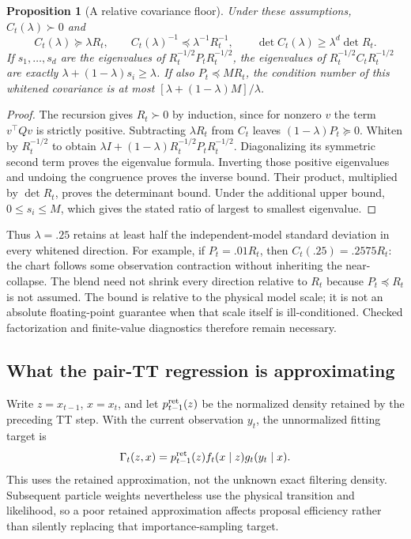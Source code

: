 \documentclass[11pt]{article}
\newtheorem{proposition}{Proposition}
\begin{document}
\begin{proposition}[A relative covariance floor]
\label{prop:a11-floor}
Under these assumptions, $C_t(\lambda)\succ0$ and
\begin{equation}
 C_t(\lambda)\succeq\lambda R_t,\qquad
 C_t(\lambda)^{-1}\preceq\lambda^{-1}R_t^{-1},\qquad
 \det C_t(\lambda)\ge\lambda^d\det R_t.
 \label{eq:a11-floor}
\end{equation}
If $s_1,\ldots,s_d$ are the eigenvalues of
$R_t^{-1/2}P_tR_t^{-1/2}$, the eigenvalues of
$R_t^{-1/2}C_tR_t^{-1/2}$ are exactly
$\lambda+(1-\lambda)s_i\ge\lambda$. If also $P_t\preceq M R_t$,
the condition number of this whitened covariance is at most
$[\lambda+(1-\lambda)M]/\lambda$.
\end{proposition}
\begin{proof}
The recursion gives $R_t\succ0$ by induction, since for nonzero $v$ the
term $v^\top Qv$ is strictly positive. Subtracting $\lambda R_t$ from
$C_t$ leaves $(1-\lambda)P_t\succeq0$. Whiten by $R_t^{-1/2}$ to obtain
$\lambda I+(1-\lambda)R_t^{-1/2}P_tR_t^{-1/2}$. Diagonalizing its
symmetric second term proves the eigenvalue formula. Inverting those
positive eigenvalues and undoing the congruence proves the inverse bound.
Their product, multiplied by $\det R_t$, proves the determinant bound.
Under the additional upper bound, $0\le s_i\le M$, which gives the
stated ratio of largest to smallest eigenvalue.
\end{proof}

Thus $\lambda=.25$ retains at least half the independent-model standard
deviation in every whitened direction. For example, if $P_t=.01R_t$,
then $C_t(.25)=.2575R_t$: the chart follows some observation contraction
without inheriting the near-collapse. The blend need not shrink every
direction relative to $R_t$ because $P_t\preceq R_t$ is not assumed.
The bound is relative to the physical model scale; it is not an absolute
floating-point guarantee when that scale itself is ill-conditioned. Checked
factorization and finite-value diagnostics therefore remain necessary.

\subsection{What the pair-TT regression is approximating}

Write $z=x_{t-1}$, $x=x_t$, and let $p_{t-1}^{\rm ret}(z)$ be the
normalized density retained by the preceding TT step. With the current
observation $y_t$, the unnormalized fitting target is
\begin{equation}
 \Gamma_t(z,x)=p_{t-1}^{\rm ret}(z)f_t(x\mid z)g_t(y_t\mid x).
 \label{eq:a11-target}
\end{equation}
This uses the retained approximation, not the unknown exact filtering
density. Subsequent particle weights nevertheless use the physical
transition and likelihood, so a poor retained approximation affects proposal
efficiency rather than silently replacing that importance-sampling target.
\end{document}
